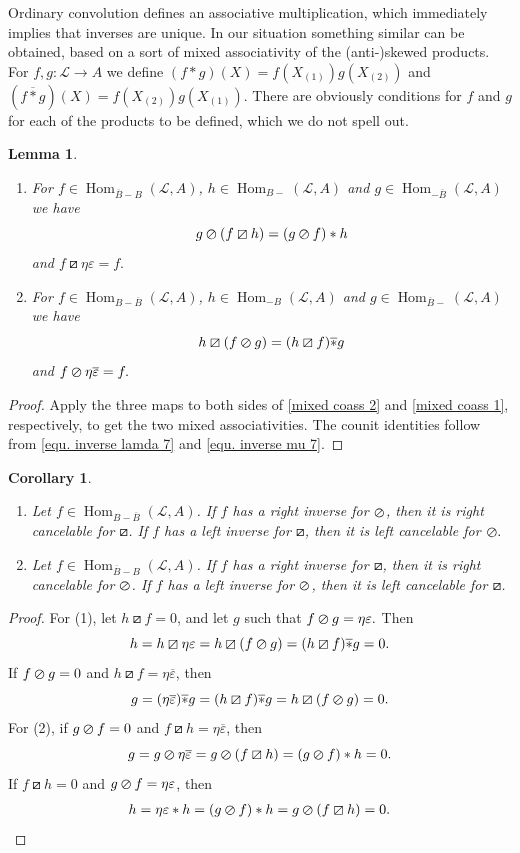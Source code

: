 \documentclass[a4paper,reqno]{amsart}
\DeclareMathOperator{\Hom}{Hom}
\numberwithin{equation}{section}
\theoremstyle{plain}
\newtheorem{lem}[thm]{Lemma}
\newtheorem{cor}[thm]{Corollary}
\theoremstyle{remark}
\numberwithin{equation}{section}
\newcommand\ol{\overline}
\renewcommand{\o}{{}_{\scriptscriptstyle{(1)}}}
\renewcommand{\t}{{}_{\scriptscriptstyle{(2)}}}
\newcommand{\CL}{\mathcal{L}}
\newcommand\skpr{\varoslash}
\newcommand\askpr{\boxslash}
\begin{document}
Ordinary convolution defines an associative multiplication, which immediately implies that inverses are unique. In our situation something similar can be obtained, based on a sort of mixed associativity of the (anti-)skewed products. For $f,g\colon\CL\to A$ we define $(f*g)(X)=f(X\o)g(X\t)$ and $(f\ol*g)(X)=f(X\t)g(X\o)$. There are obviously conditions for $f$ and $g$ for each of the products to be defined, which we do not spell out.
\begin{lem}
    \begin{enumerate}
        \item For $f\in\Hom_{\ol B-B}(\CL,A)$, $h\in\Hom_{B-}(\CL,A)$ and $g\in\Hom_{-\ol B}(\CL,A)$ we have
        \[g\skpr(f\askpr h)=(g\skpr f)*h\]
        and $f\askpr\eta\varepsilon=f.$
    \item For $f\in\Hom_{B-\ol B }(\CL,A)$, $h\in\Hom_{-B}(\CL,A)$ and $g\in\Hom_{\ol B-}(\CL,A)$ we have
    \[h\askpr(f\skpr g)=(h\askpr f)\ol* g\]
    and $f\skpr\eta\overline{\varepsilon}=f.$
    \end{enumerate}
\end{lem}
\begin{proof}
  Apply the three maps to both sides of \eqref{mixed coass 2} and \eqref{mixed coass 1}, respectively, to get the two mixed associativities. The counit identities follow from \eqref{equ. inverse lamda 7} and \eqref{equ. inverse mu 7}.
\end{proof}
\begin{cor}\label{lem. cancelable}
    \begin{enumerate}
        \item Let  $f\in\Hom_{ B-\ol B}(\CL,A)$. If $f$ has a right inverse for $\skpr$, then it is right cancelable for $\askpr$. If $f$ has a left inverse for $\askpr$, then it is left cancelable for $\skpr.$
        \item Let $f\in\Hom_{\ol B-B}(\CL,A)$. If $f$ has a right inverse for $\askpr$, then it is right cancelable for $\skpr$. If $f$ has a left inverse for $\skpr$, then it is left cancelable for $\askpr$.
    \end{enumerate}
\end{cor}
\begin{proof}
  For (1),  let $h\askpr f=0$, and let $g$ such that $f\skpr g=\eta\varepsilon.$ Then 
    \[h=h\askpr\eta\varepsilon=h\askpr (f\skpr g)=(h\askpr f)\ol* g=0.\]
If $f\skpr g=0$ and $h\askpr f=\eta\ol\varepsilon$, then 
    \[g=(\eta\ol{\varepsilon}) \ol{*} g=(h\askpr f)\ol{*} g=h\askpr (f\skpr g)=0.\]
For (2), if $g\skpr f=0$ and $f\askpr h=\eta\ol\varepsilon$, then 
    \[g=g\skpr\eta\ol\varepsilon=g\skpr(f\askpr h)=(g\skpr f)*h=0.\]    
   If $f\askpr h=0$ and $g\skpr f=\eta \varepsilon$, then
   \begin{align*}
       h=\eta\varepsilon\ast h=(g\skpr f)\ast h=g\skpr (f \askpr h)=0.
   \end{align*}
   \end{proof}
\end{document}
